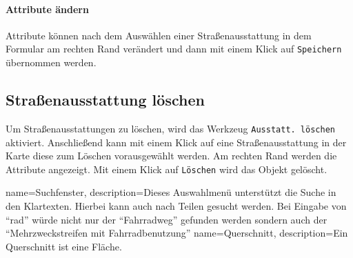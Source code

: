 \documentclass[a4paper,11pt,bibliography=totoc, listof=totoc,titlepage]{scrartcl}
\begin{document}
\paragraph{Attribute ändern}
Attribute können nach dem Auswählen einer Straßenausstattung in dem Formular am rechten Rand verändert und dann mit einem Klick auf \verb|Speichern| übernommen werden.

\subsection{Straßenausstattung löschen}
Um Straßenausstattungen zu löschen, wird das Werkzeug \verb|Ausstatt. löschen| aktiviert. Anschließend kann mit einem Klick auf eine Straßenausstattung in der Karte diese zum Löschen vorausgewählt werden. Am rechten Rand werden die Attribute angezeigt. Mit einem Klick auf \verb|Löschen| wird das Objekt gelöscht.

\clearpage

{
    name=Suchfenster,
    description={Dieses Auswahlmenü unterstützt die Suche in den Klartexten. Hierbei kann auch nach Teilen gesucht werden. Bei Eingabe von ``rad'' würde nicht nur der ``Fahrradweg'' gefunden werden sondern auch der ``Mehrzweckstreifen mit Fahrradbenutzung''}
}
{
    name=Querschnitt,
    description={Ein Querschnitt ist eine Fläche.}
}

\printglossaries
\end{document}
